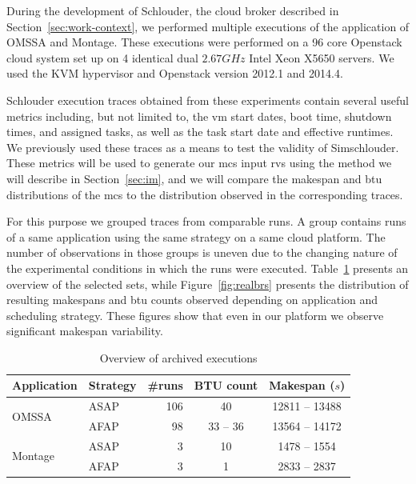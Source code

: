 \documentclass[10pt,conference,compsocconf]{IEEEtran}
\begin{document}
During the development of Schlouder, the cloud broker described in
Section~\ref{sec:work-context}, we performed multiple executions of the
application of OMSSA and Montage. These executions were performed on a 96 core
Openstack cloud system set up on 4 identical dual $2.67GHz$ Intel Xeon X5650
servers. We used the KVM hypervisor and Openstack version 2012.1 and 2014.4.

Schlouder  execution  traces obtained  from  these  experiments contain  several
useful metrics  including, but  not limited  to, the  \ac{vm} start  dates, boot
time, shutdown  times, and assigned  tasks, as well as  the task start  date and
effective  runtimes. We  previously used  these traces  as a  means to  test the
validity of Simschlouder.   These metrics will be used to  generate our \ac{mcs}
input \acp{rv} using the method we will describe in Section~\ref{sec:im}, and we
will compare  the makespan  and \ac{btu}  distributions of  the \ac{mcs}  to the
distribution observed in the corresponding traces.

For this purpose we grouped traces  from comparable runs.  A group contains runs
of a  same application  using the same  strategy on a  same cloud  platform. The
number of observations in  those groups is uneven due to  the changing nature of
the    experimental   conditions    in   which    the   runs    were   executed.
Table~\ref{tab:nbruns}  presents  an  overview   of  the  selected  sets,  while
Figure~\ref{fig:realbrs} presents the distribution of resulting makespans and
\ac{btu} counts observed depending on application and scheduling strategy. These
figures show that even in our platform we observe significant makespan
variability.

\begin{table} \centering \caption{Overview of archived
	executions}\label{tab:nbruns} 
	\begin{tabular}{llrcc} \toprule
		Application&Strategy&\#runs&BTU count&Makespan ($s$)\\
		\midrule 
		\multirow{2}{*}{OMSSA}&ASAP&106&40&12811 -- 13488\\
				      &AFAP&98&33 -- 36&13564 -- 14172\\ 
		\midrule 
		\multirow{2}{*}{Montage}&ASAP&3&10&1478 -- 1554\\
				        &AFAP&3&1&2833 -- 2837\\
		\bottomrule 
	\end{tabular} 
\end{table}
\end{document}
